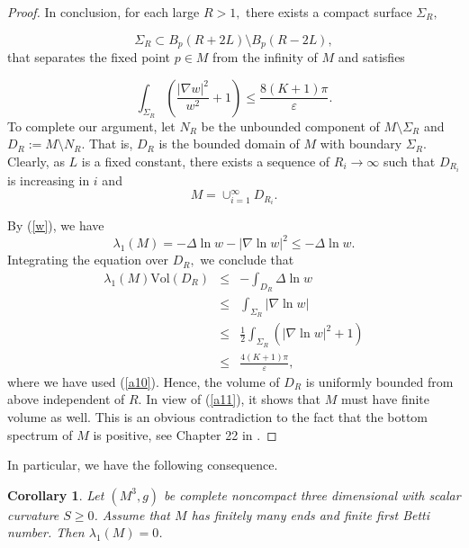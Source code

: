 \documentclass{amsart}
\newtheorem{corollary}[theorem]{Corollary}
\numberwithin{equation}{section}
\begin{document}
\begin{proof}
In conclusion, for each large $R>1,$ there exists a compact surface $\Sigma_{R},$ 

\begin{equation*}
\Sigma _{R}\subset B_{p}\left( R+2L\right) \setminus B_{p}\left( R-2L\right),
\end{equation*}
that separates the fixed point $p\in M$ from the infinity of $M$ and satisfies

\begin{equation}
\int_{\Sigma _{R}}\left( \frac{\left\vert \nabla w\right\vert ^{2}}{w^{2}}%
+1\right) \leq \frac{8\left( K+1\right) \pi }{\varepsilon }.  \label{a10}
\end{equation}
To complete our argument, let $N_{R}$ be the unbounded component of $M\setminus \Sigma _{R}$ and 
$D_{R}:=M\setminus N_{R}$. That is, $D_{R}$ is the bounded domain of $M$ with
boundary $\Sigma _{R}.$ Clearly,  as $L$ is a fixed constant, there exists a sequence of $R_i\to \infty$
such that $D_{R_i}$ is increasing in $i$ and
\begin{equation}
M=\cup _{i=1}^\infty D_{R_i}.  \label{a11}
\end{equation}

By (\ref{w}), we have
\begin{equation*}
\lambda _{1}\left( M\right) =-\Delta \ln w-\left\vert \nabla \ln
w\right\vert ^{2}\leq -\Delta \ln w.
\end{equation*}%
Integrating the equation over $D_R,$ we conclude that 
\begin{eqnarray*}
\lambda _{1}\left( M\right) \mathrm{Vol}\left( D_{R}\right) &\leq
&-\int_{D_{R}}\Delta \ln w \\
&\leq &\int_{\Sigma _{R}}\left\vert \nabla \ln w\right\vert \\
&\leq &\frac{1}{2}\int_{\Sigma _{R}}\left( \left\vert \nabla \ln
w\right\vert ^{2}+1\right) \\
&\leq &\frac{4\left( K+1\right) \pi }{\varepsilon },
\end{eqnarray*}
where we have used (\ref{a10}).
Hence, the volume of $D_{R}$ is uniformly bounded from above independent of $R.$ In view of (\ref{a11}), it shows that
$M$ must have finite volume as well. This is an obvious contradiction to the fact that the bottom spectrum of $M$ is positive, see Chapter 22 in \cite{Li}.
\end{proof}

In particular, we have the following consequence.

\begin{corollary}
Let $\left( M^{3},g\right) $ be complete noncompact three dimensional with
scalar curvature $S\geq 0$. Assume that $M$ has finitely many ends and
finite first Betti number. Then $\lambda _{1}\left( M\right) =0$.
\end{corollary}
\end{document}
